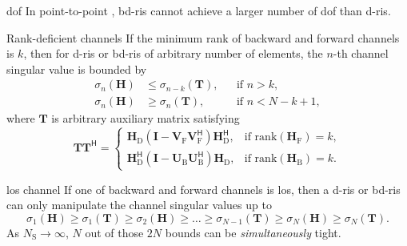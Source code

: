 \documentclass[final,xcolor={table}]{beamer}
\newlength{\colwidth}
\begin{document}
\begin{frame}[t]
\begin{columns}[t]
		\begin{column}{\colwidth}
			\vspace{-0.5cm}
			\begin{prop}{\gls{dof}}{}
				\setlength{\leftskip}{\leftmargini}
				\setlength{\rightskip}{\leftmargini}
				In point-to-point , \gls{bd}-\gls{ris} cannot achieve a larger number of \gls{dof} than \gls{d}-\gls{ris}.
			\end{prop}

			\begin{prop}{Rank-deficient channels}{}
				\setlength{\leftskip}{\leftmargini}
				\setlength{\rightskip}{\leftmargini}
				If the minimum rank of backward and forward channels is $k$,
				then for \gls{d}-\gls{ris} or \gls{bd}-\gls{ris} of arbitrary number of elements, the $n$-th channel singular value is bounded by
				\begin{align*}
					\sigma_n(\mathbf{H}) & \le \sigma_{n-k}(\mathbf{T}), &  & \text{if } n > k, \\
					\sigma_n(\mathbf{H}) & \ge \sigma_n(\mathbf{T}),     &  & \text{if } n < N - k + 1,
				\end{align*}
				where $\mathbf{T}$ is arbitrary auxiliary matrix satisfying
				\begin{equation*}
					\mathbf{T} \mathbf{T}^\mathsf{H} =
					\begin{cases}
						\mathbf{H}_\mathrm{D} (\mathbf{I} - \mathbf{V}_\mathrm{F} \mathbf{V}_\mathrm{F}^\mathsf{H}) \mathbf{H}_\mathrm{D}^\mathsf{H}, & \text{if } \mathrm{rank}(\mathbf{H}_\mathrm{F}) = k, \\
						\mathbf{H}_\mathrm{D}^\mathsf{H} (\mathbf{I} - \mathbf{U}_\mathrm{B} \mathbf{U}_\mathrm{B}^\mathsf{H}) \mathbf{H}_\mathrm{D}, & \text{if } \mathrm{rank}(\mathbf{H}_\mathrm{B}) = k.
					\end{cases}
				\end{equation*}
				\vspace{-0.5cm}
			\end{prop}

			\begin{coro}{\gls{los} channel}{}
				\setlength{\leftskip}{\leftmargini}
				\setlength{\rightskip}{\leftmargini}
				If one of backward and forward channels is \gls{los}, then a \gls{d}-\gls{ris} or \gls{bd}-\gls{ris} can only manipulate the channel singular values up to
				\begin{equation*}
					\sigma_1(\mathbf{H}) \ge \sigma_1(\mathbf{T}) \ge {\sigma_2(\mathbf{H})} \ge \ldots \ge \sigma_{N-1}(\mathbf{T}) \ge {\sigma_N(\mathbf{H})} \ge \sigma_N(\mathbf{T}).
				\end{equation*}
				As $N_\mathrm{S} \to \infty$, $N$ out of those $2N$ bounds can be \emph{simultaneously} tight.
			\end{coro}


\end{column}
\end{columns}
\end{frame}
\end{document}

